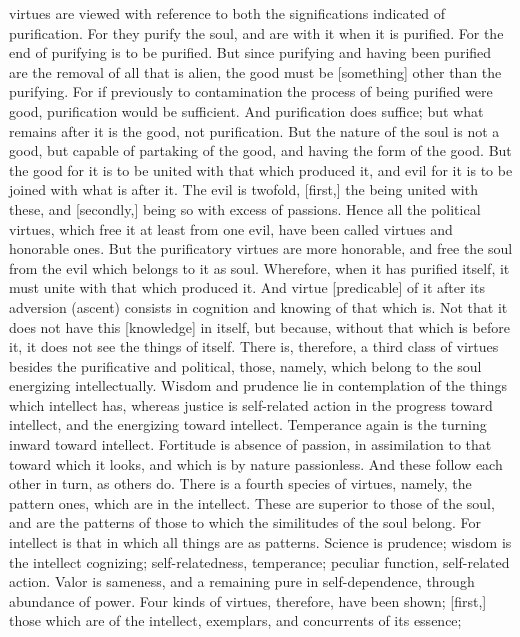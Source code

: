\documentclass[12pt]{article}
\begin{document}
virtues are viewed with reference to both the significations indicated of
purification. For they purify the soul, and are with it when it is purified.
For the end of purifying is to be purified. But since purifying and having been
purified are the removal of all that is alien, the good must be [something]
other than the purifying. For if previously to contamination the process of
being purified were good, purification would be sufficient. And purification
does suffice; but what remains after it is the good, not purification. But the
nature of the soul is not a good, but capable of partaking of the good, and
having the form of the good. But the good for it is to be united with that
which produced it, and evil for it is to be joined with what is after it. The
evil is twofold, [first,] the being united with these, and [secondly,] being so
with excess of passions. Hence all the political virtues, which free it at
least from one evil, have been called virtues and honorable ones. But the
purificatory virtues are more honorable, and free the soul from the evil which
belongs to it as soul. Wherefore, when it has purified itself, it must unite
with that which produced it. And virtue [predicable] of it after its adversion
(ascent) consists in cognition and knowing of that which is. Not that it does
not have this [knowledge] in itself, but because, without that which is before
it, it does not see the things of itself. There is, therefore, a third class of
virtues besides the purificative and political, those, namely, which belong to
the soul energizing intellectually. Wisdom and prudence lie in contemplation of
the things which intellect has, whereas justice is self-related action in the
progress toward intellect, and the energizing toward intellect. Temperance
again is the turning inward toward intellect. Fortitude is absence of passion,
in assimilation to that toward which it looks, and which is by nature
passionless. And these follow each other in turn, as others do. There is a
fourth species of virtues, namely, the pattern ones, which are in the
intellect. These are superior to those of the soul, and are the patterns of
those to which the similitudes of the soul belong. For intellect is that in
which all things are as patterns. Science is prudence; wisdom is the intellect
cognizing; self-relatedness, temperance; peculiar function, self-related
action. Valor is sameness, and a remaining pure in self-dependence, through
abundance of power. Four kinds of virtues, therefore, have been shown; [first,]
those which are of the intellect, exemplars, and concurrents of its es\-sence;
\end{document}
